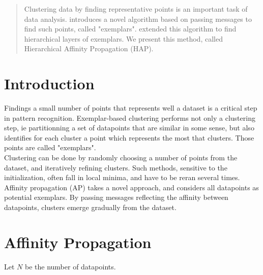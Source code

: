\documentclass{ipol}
\begin{document}
\begin{abstract}

Clustering data by finding representative points is an important task of data
analysis. \cite{frey07affinitypropagation} introduces a novel algorithm based
on passing messages to find such points, called "exemplars". \cite{hap}
extended this algorithm to find hierarchical layers of exemplars. We present
this method, called Hierarchical Affinity Propagation (HAP).

\end{abstract}

\begin{ipolCode}
\end{ipolCode}

\begin{ipolSupp}
\end{ipolSupp}

\section{Introduction}

Findings a small number of points that represents well a dataset is a critical
step in pattern recognition. Exemplar-based clustering performs not only a
clustering step, ie partitionning a set of datapoints that are similar in some
sense, but also identifies for each cluster a point which represents the most
that clusters. Those points are called "exemplars". \\
Clustering can be done by randomly choosing a number of points from
the dataset, and iteratively refining clusters. Such methods, sensitive to the
initialization, often fall in local minima, and have to be reran several
times.\\
Affinity propagation (AP) takes a novel approach, and considers all datapoints
as potential exemplars. By passing messages reflecting the affinity between
datapoints, clusters emerge gradually from the dataset. \\

\section{Affinity Propagation}
Let $N$ be the number of datapoints.
\end{document}
